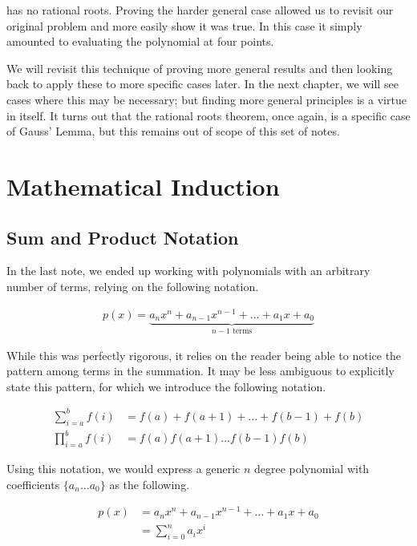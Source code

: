 \documentclass[twoside]{report}
\begin{document}
has no rational roots. Proving the harder general case allowed us to revisit our original problem and more easily show it was true. In this case it simply amounted to evaluating the polynomial at four points.

\vspace{\baselineskip}

We will revisit this technique of proving more general results and then looking back to apply these to more specific cases later. In the next chapter, we will see cases where this may be necessary; but finding more general principles is a virtue in itself. It turns out that the rational roots theorem, once again, is a specific case of Gauss' Lemma, but this remains out of scope of this set of notes.
	
\chapter{Mathematical Induction}

\section{Sum and Product Notation}

In the last note, we ended up working with polynomials with an arbitrary number of terms, relying on the following notation.

\begin{align*}
	p(x) = \underbrace{a_n x^n + a_{n - 1} x^{n - 1} + \dots + a_1 x + a_0}_\text{$n - 1$ terms}
\end{align*}

While this was perfectly rigorous, it relies on the reader being able to notice the pattern among terms in the summation. It may be less ambiguous to explicitly state this pattern, for which we introduce the following notation.

\begin{align*}
	\sum_{i = a}^b f(i) &= f(a) + f(a + 1) + \dots + f(b - 1) + f(b) \\
	\prod_{i = a}^b f(i) &= f(a) f(a + 1) \dots f(b - 1) f(b)
\end{align*}

Using this notation, we would express a generic $n$ degree polynomial with coefficients $\{ a_n \dots a_0 \}$ as the following.

\begin{align*}
	p(x) &= a_n x^n + a_{n - 1} x^{n - 1} + \dots + a_1 x + a_0 \\
	&= \sum_{i = 0}^n a_i x^i
\end{align*}
\end{document}
